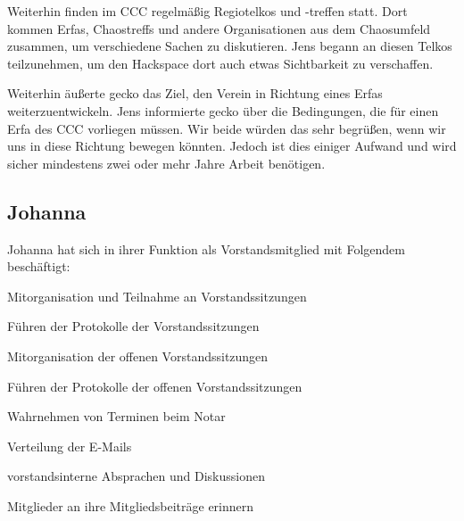 \documentclass[ngerman]{scrartcl}
\begin{document}
Weiterhin finden im CCC regelmäßig Regiotelkos und -treffen statt. Dort kommen
Erfas, Chaostreffs und andere Organisationen aus dem Chaosumfeld zusammen, um
verschiedene Sachen zu diskutieren. Jens begann an diesen Telkos teilzunehmen,
um den Hackspace dort auch etwas Sichtbarkeit zu verschaffen.

Weiterhin äußerte gecko das Ziel, den Verein in Richtung eines Erfas
weiterzuentwickeln. Jens informierte gecko über die Bedingungen, die für einen
Erfa des CCC vorliegen müssen. Wir beide würden das sehr begrüßen, wenn wir uns
in diese Richtung bewegen könnten. Jedoch ist dies einiger Aufwand und wird
sicher mindestens zwei oder mehr Jahre Arbeit benötigen.

\subsection{Johanna}

Johanna hat sich in ihrer Funktion als Vorstandsmitglied mit Folgendem 
beschäftigt:

\begin{compactitem}
    \item Mitorganisation und Teilnahme an Vorstandssitzungen
    \item Führen der Protokolle der Vorstandssitzungen
    \item Mitorganisation der offenen Vorstandssitzungen
    \item Führen der Protokolle der offenen Vorstandssitzungen
    \item Wahrnehmen von Terminen beim Notar
    \item Verteilung der E-Mails
    \item vorstandsinterne Absprachen und Diskussionen 
    \item Mitglieder an ihre Mitgliedsbeiträge erinnern
\end{compactitem}
\end{document}

